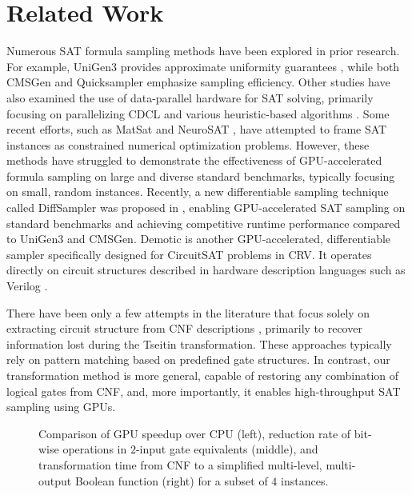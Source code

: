 \section{Related Work}
Numerous SAT formula sampling methods have been explored in prior research. For example, {\sc UniGen3} provides approximate uniformity guarantees \cite{yash2022barbarik}, while both {\sc CMSGen} and {\sc Quicksampler} \cite{dutra2018quicksampler} emphasize sampling efficiency. Other studies have also examined the use of data-parallel hardware for SAT solving, primarily focusing on parallelizing CDCL and various heuristic-based algorithms \cite{costa2013parallelization, osama2021sat}. Some recent efforts, such as {\sc MatSat} \cite{sato2021matsat} and {\sc NeuroSAT} \cite{amizadeh2018learning}, have attempted to frame SAT instances as constrained numerical optimization problems. However, these methods have struggled to demonstrate the effectiveness of GPU-accelerated formula sampling on large and diverse standard benchmarks, typically focusing on small, random instances. Recently, a new differentiable sampling technique called {\sc DiffSampler} was proposed in \cite{Ardakani2024diffsampler}, enabling GPU-accelerated SAT sampling on standard benchmarks and achieving competitive runtime performance compared to {\sc UniGen3} and {\sc CMSGen}. {\sc Demotic} is another GPU-accelerated, differentiable sampler specifically designed for CircuitSAT problems in CRV. It operates directly on circuit structures described in hardware description languages such as Verilog \cite{Ardakani2025Demotic}.

There have been only a few attempts in the literature that focus solely on extracting circuit structure from CNF descriptions \cite{Fu2007ExtractingLC, roy2004restoring}, primarily to recover information lost during the Tseitin transformation. These approaches typically rely on pattern matching based on predefined gate structures. In contrast, our transformation method is more general, capable of restoring any combination of logical gates from CNF, and, more importantly, it enables high-throughput SAT sampling using GPUs.

\begin{figure}[t]
    \centering
    \scalebox{0.85}{
    }
    \caption{Comparison of GPU speedup over CPU (left), reduction rate of bit-wise operations in $2$-input gate equivalents (middle), and transformation time from CNF to a simplified multi-level, multi-output Boolean function (right) for a subset of $4$ instances.}
    \label{fig5}
    \vspace{-0.3cm}
\end{figure}
